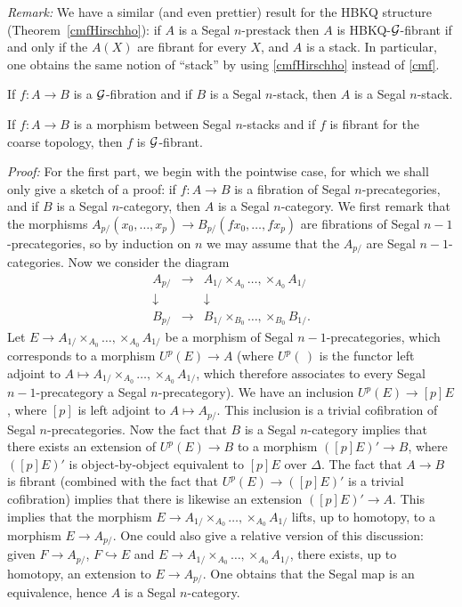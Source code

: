 {\em Remark:} We have a similar (and even prettier) result for the
HBKQ structure (Theorem~\ref{cmfHirschho}): if $A$ is a
Segal $n$-prestack then $A$ is HBKQ-${\cal G}$-fibrant if and
only
if the $A(X)$ are fibrant for every $X$, and $A$ is a stack. In particular,
one obtains the same notion of ``stack'' by using
\ref{cmfHirschho} instead of \ref{cmf}.


\begin{lemma}
\label{stuff}
If $f: A\rightarrow B$ is a
${\cal G}$-fibration and if $B$ is a Segal $n$-stack, then $A$ is a
Segal $n$-stack.

If $f: A\rightarrow B$ is a morphism between Segal $n$-stacks
and if $f$ is fibrant for the coarse topology, then
$f$ is ${\cal G}$-fibrant.
\end{lemma}
{\em Proof:}
For the first part, we begin with the pointwise case, for which we shall
only give a sketch of a proof:
if $f:A\rightarrow B$ is a fibration of Segal $n$-precategories, and if $B$ is
a Segal $n$-category, then $A$ is a Segal $n$-category.
We first remark that the morphisms
$A_{p/}(x_0,\ldots , x_p)\rightarrow B_{p/}(fx_0,\ldots ,fx_p)$ are
fibrations of Segal $n-1$-precategories, so by induction on $n$ we may
assume that the $A_{p/}$ are Segal $n-1$-categories. Now
we consider the diagram $$
\begin{array}{ccc}
A_{p/}&\rightarrow &A_{1/}\times _{A_0}\ldots , \times _{A_0}A_{1/}\\
\downarrow && \downarrow \\
B_{p/}&\rightarrow &B_{1/}\times _{B_0}\ldots , \times _{B_0}B_{1/}.
\end{array}
$$
Let $E\rightarrow A_{1/}\times _{A_0}\ldots , \times _{A_0}A_{1/}$
be a morphism of Segal $n-1$-precategories,
which corresponds to a morphism $U^p(E)\rightarrow A$
(where $U^p(\, )$ is the functor left adjoint to
$A\mapsto A_{1/}\times _{A_0}\ldots , \times
_{A_0}A_{1/}$, which therefore associates to every Segal $n-1$-precategory
a Segal $n$-precategory). We have an inclusion $U^p(E)\rightarrow [p]E$, where $[p]$ is
left adjoint to $A\mapsto A_{p/}$.
This inclusion is a trivial cofibration
of Segal $n$-precategories. Now the fact that $B$ is a Segal
$n$-category implies that there exists an extension of $U^p(E)\rightarrow B$
to a morphism $([p]E)'\rightarrow B$, where $([p]E)'$ is
object-by-object equivalent to $[p]E$ over $\Delta$. The fact that $A\rightarrow B$
is fibrant (combined with the fact that $U^p(E)\rightarrow ([p]E)'$ is a
trivial cofibration) implies that there is likewise an extension
$([p]E)'\rightarrow A$. This implies that the morphism $E\rightarrow
A_{1/}\times _{A_0}\ldots , \times _{A_0}A_{1/}$ lifts, up to homotopy,
to a morphism $E\rightarrow A_{p/}$. One could also give a
relative version of this discussion: given $F\rightarrow A_{p/}$,
$F\hookrightarrow E$ and $E\rightarrow A_{1/}\times _{A_0}\ldots , \times
_{A_0}A_{1/}$, there exists, up to homotopy, an extension to $E\rightarrow
A_{p/}$. One obtains that the Segal map is an equivalence, hence $A$
is a Segal $n$-category.


